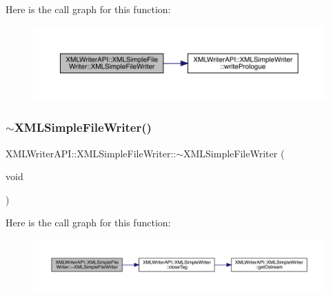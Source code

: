 Here is the call graph for this function\+:
\nopagebreak
\begin{figure}[H]
\begin{center}
\leavevmode
\includegraphics[width=350pt]{d2/de2/classXMLWriterAPI_1_1XMLSimpleFileWriter_a8ce4f6691f7e2e803a14e0cba906a4b7_cgraph}
\end{center}
\end{figure}
\mbox{\label{classXMLWriterAPI_1_1XMLSimpleFileWriter_a8a18cf3ea74f63a4f84a434237109e68}} 
\subsubsection{\texorpdfstring{$\sim$XMLSimpleFileWriter()}{~XMLSimpleFileWriter()}\hspace{0.1cm}{\footnotesize\ttfamily [1/2]}}
{\footnotesize\ttfamily X\+M\+L\+Writer\+A\+P\+I\+::\+X\+M\+L\+Simple\+File\+Writer\+::$\sim$\+X\+M\+L\+Simple\+File\+Writer (\begin{DoxyParamCaption}\item[{void}]{ }\end{DoxyParamCaption})\hspace{0.3cm}{\ttfamily [inline]}}

Here is the call graph for this function\+:
\nopagebreak
\begin{figure}[H]
\begin{center}
\leavevmode
\includegraphics[width=350pt]{d2/de2/classXMLWriterAPI_1_1XMLSimpleFileWriter_a8a18cf3ea74f63a4f84a434237109e68_cgraph}
\end{center}
\end{figure}
\mbox{\label{classXMLWriterAPI_1_1XMLSimpleFileWriter_a8ce4f6691f7e2e803a14e0cba906a4b7}} 
